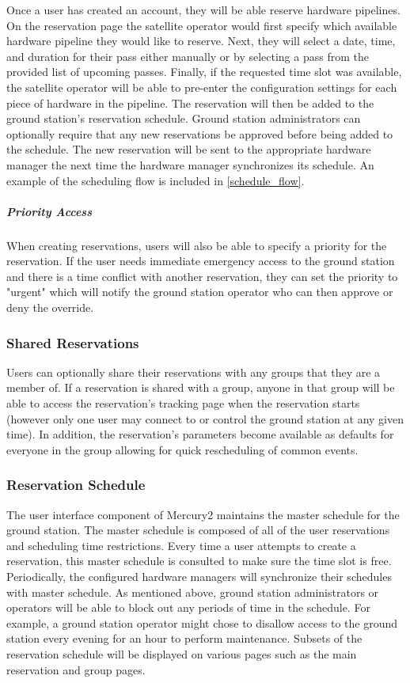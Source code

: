 \documentclass{mxl-design}
\begin{document}
Once a user has created an account, they will be able reserve hardware pipelines. On the reservation page the satellite operator would first specify which available hardware pipeline they would like to reserve. Next, they will select a date, time, and duration for their pass either manually or by selecting a pass from the provided list of upcoming passes. Finally, if the requested time slot was available, the satellite operator will be able to pre-enter the configuration settings for each piece of hardware in the pipeline. The reservation will then be added to the ground station's reservation schedule. Ground station administrators can optionally require that any new reservations be approved before being added to the schedule. The new reservation will be sent to the appropriate hardware manager the next time the hardware manager synchronizes its schedule. An example of the scheduling flow is included in \ref{schedule_flow}.

\subparagraph{Priority Access} When creating reservations, users will also be able to specify a priority for the reservation. If the user needs immediate emergency access to the ground station and there is a time conflict with another reservation, they can set the priority to "urgent" which will notify the ground station operator who can then approve or deny the override.

\subsubsection{Shared Reservations}
Users can optionally share their reservations with any groups that they are a member of. If a reservation is shared with a group, anyone in that group will be able to access the reservation's tracking page when the reservation starts (however only one user may connect to or control the ground station at any given time). In addition, the reservation's parameters become available as defaults for everyone in the group allowing for quick rescheduling of common events.

\subsubsection{Reservation Schedule}
The user interface component of Mercury2 maintains the master schedule for the ground station. The master schedule is composed of all of the user reservations and scheduling time restrictions. Every time a user attempts to create a reservation, this master schedule is consulted to make sure the time slot is free. Periodically, the configured hardware managers will synchronize their schedules with master schedule. As mentioned above, ground station administrators or operators will be able to block out any periods of time in the schedule. For example, a ground station operator might chose to disallow access to the ground station every evening for an hour to perform maintenance. Subsets of the reservation schedule will be displayed on various pages such as the main reservation  and group pages.
 
\end{document}
